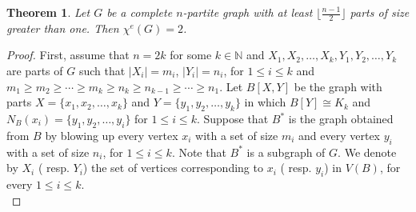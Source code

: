 \documentclass[12pt,a4paper]{article}
\newtheorem{theorem}{\bf Theorem}[section]
\begin{document}
\begin{theorem}\label{g1}
	Let  $G$ be a complete $ n$-partite graph with at least $\lfloor \frac{n-1}{2}\rfloor$ parts of size greater than one. Then $ \chi^{e}(G) =2$.
\end{theorem}
\begin{proof}
	First, assume that $ n=2k $ for some $k\in \mathbb{N}$ and $X_1, X_2, \ldots ,X_k, Y_1,Y_2,\ldots ,Y_k$ are  parts of $G$ such that $|X_i|=m_i$, $|Y_i|=n_i$,  for $ 1\leq i\leq k $ and  $m_1\geq m_2\geq \cdots \geq m_k\geq n_k\geq n_{k-1}\geq \cdots \geq n_1$.
	Let $ B[X,Y] $ be the  graph with parts $ X=\{x_1,x_2,\ldots, x_k\} $ and $ Y=\{y_1,y_2,\ldots, y_k\} $ in which $ B[Y]\cong K_k $ and $ N_B(x_i)=\{y_1,y_2,\ldots, y_i\} $ for $ 1\leq i \leq k $.
	Suppose that $ B^* $ is the graph obtained from $ B $ by blowing up  every vertex $x_i$ with a set of  size $m_i$ and every vertex $y_i$ with a set of  size $n_i$, for $1\leq i \leq k $. Note that $B^*$ is a subgraph of $G$.
	We denote by $X_i $ ( resp. $Y_i$)   the set of  vertices corresponding to $x_i$ ( resp. $y_i$) in $V(B)$,  for every   $1\leq i \leq k $.\\
	

\end{proof}
\end{document}
